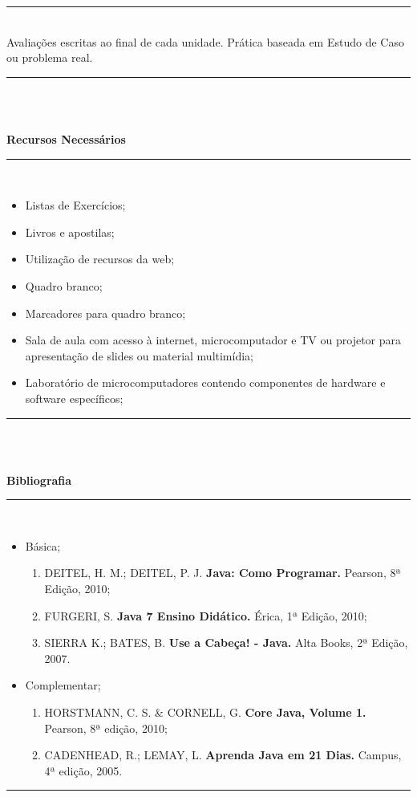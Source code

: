 \vspace{-5mm}
\noindent\rule{16.5cm}{0.4pt}
\\
   Avaliações escritas ao final de cada unidade. Prática baseada em Estudo de Caso ou problema real.\\
\noindent\rule{16.5cm}{0.4pt}\\
\\
\vspace{-12mm}
\begin{center}\textbf{Recursos Necessários}\end{center}
\vspace{-5mm}
\noindent\rule{16.5cm}{0.4pt}
\\
\begin{itemize} 
  \item Listas de Exercícios;
  \item Livros e apostilas;
  \item Utilização de recursos da web;
  \item Quadro branco;
  \item Marcadores para quadro branco;
  \item Sala de aula com acesso à internet, microcomputador e TV ou projetor para apresentação de slides ou material multimídia;
  \item Laboratório de microcomputadores contendo componentes de hardware e software específicos;
\end{itemize}
\noindent\rule{16.5cm}{0.4pt}\\
\\
\vspace{-12mm}
\begin{center}\textbf{Bibliografia}\end{center}
\vspace{-5mm}
\noindent\rule{16.5cm}{0.4pt}
\\
\begin{itemize} 
  \item Básica;
	\begin{enumerate}
  	\item DEITEL, H. M.; DEITEL, P. J. \textbf{Java: Como Programar.} Pearson, 8ª Edição, 2010;
	\item FURGERI, S. \textbf{Java 7 Ensino Didático.} Érica, 1ª Edição, 2010;
	\item SIERRA K.; BATES, B. \textbf{Use a Cabeça! - Java.} Alta Books, 2ª Edição, 2007.
	\end{enumerate}
  \item Complementar;
	\begin{enumerate}
  	\item HORSTMANN, C. S. \& CORNELL, G. \textbf{Core Java, Volume 1.} Pearson, 8ª edição, 2010;
	\item CADENHEAD, R.; LEMAY, L. \textbf{Aprenda Java em 21 Dias.} Campus, 4ª edição, 2005.
	\end{enumerate}
\end{itemize}
\noindent\rule{16.5cm}{0.4pt}\\
\\


